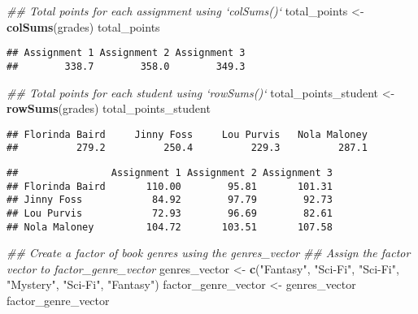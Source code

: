 \documentclass[
]{article}
\newenvironment{Shaded}{\begin{snugshade}}{\end{snugshade}}
\newcommand{\CommentTok}[1]{\textcolor[rgb]{0.56,0.35,0.01}{\textit{#1}}}
\newcommand{\FloatTok}[1]{\textcolor[rgb]{0.00,0.00,0.81}{#1}}
\newcommand{\KeywordTok}[1]{\textcolor[rgb]{0.13,0.29,0.53}{\textbf{#1}}}
\newcommand{\NormalTok}[1]{#1}
\newcommand{\OperatorTok}[1]{\textcolor[rgb]{0.81,0.36,0.00}{\textbf{#1}}}
\newcommand{\StringTok}[1]{\textcolor[rgb]{0.31,0.60,0.02}{#1}}
\begin{document}
\begin{Shaded}
\begin{Highlighting}[]
\CommentTok{## Total points for each assignment using `colSums()`}
\NormalTok{total_points <-}\StringTok{ }\KeywordTok{colSums}\NormalTok{(grades)}
\NormalTok{total_points}
\end{Highlighting}
\end{Shaded}

\begin{verbatim}
## Assignment 1 Assignment 2 Assignment 3 
##        338.7        358.0        349.3
\end{verbatim}

\begin{Shaded}
\begin{Highlighting}[]
\CommentTok{## Total points for each student using `rowSums()`}
\NormalTok{total_points_student <-}\StringTok{ }\KeywordTok{rowSums}\NormalTok{(grades)}
\NormalTok{total_points_student}
\end{Highlighting}
\end{Shaded}

\begin{verbatim}
## Florinda Baird     Jinny Foss     Lou Purvis   Nola Maloney 
##          279.2          250.4          229.3          287.1
\end{verbatim}

\begin{Shaded}
\end{Shaded}

\begin{verbatim}
##                Assignment 1 Assignment 2 Assignment 3
## Florinda Baird       110.00        95.81       101.31
## Jinny Foss            84.92        97.79        92.73
## Lou Purvis            72.93        96.69        82.61
## Nola Maloney         104.72       103.51       107.58
\end{verbatim}

\begin{Shaded}
\begin{Highlighting}[]
\CommentTok{## Create a factor of book genres using the genres_vector}
\CommentTok{## Assign the factor vector to factor_genre_vector}
\NormalTok{genres_vector <-}\StringTok{ }\KeywordTok{c}\NormalTok{(}\StringTok{"Fantasy"}\NormalTok{, }\StringTok{"Sci-Fi"}\NormalTok{, }\StringTok{"Sci-Fi"}\NormalTok{, }\StringTok{"Mystery"}\NormalTok{, }\StringTok{"Sci-Fi"}\NormalTok{, }\StringTok{"Fantasy"}\NormalTok{)}
\NormalTok{factor_genre_vector <-}\StringTok{ }\NormalTok{genres_vector}
\NormalTok{factor_genre_vector}
\end{Highlighting}
\end{Shaded}
\end{document}
